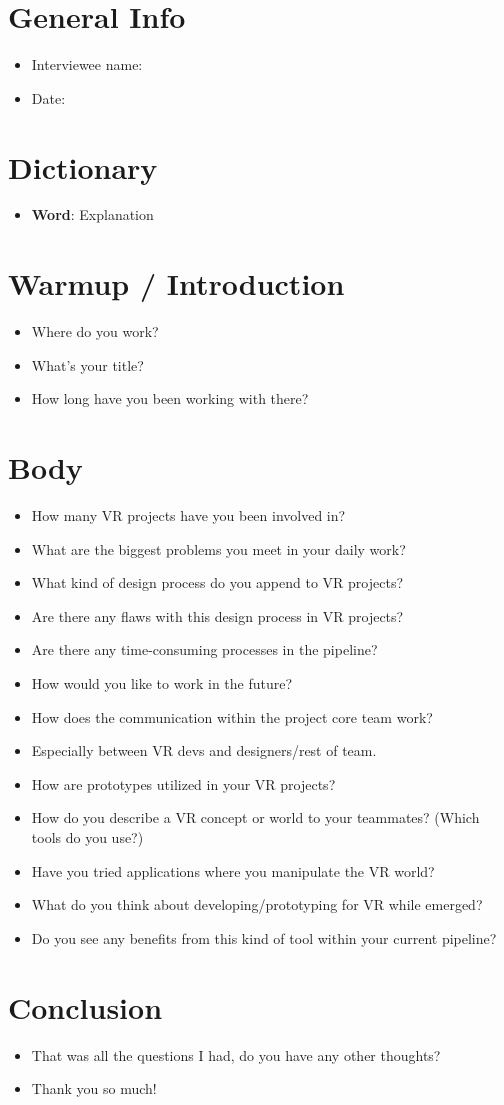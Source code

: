 \section{General Info}
{\renewcommand\labelitemi{}
\begin{itemize}
  \item Interviewee name:
  \item Date:
\end{itemize}
\section{Dictionary}
\begin{itemize}
  \item \textbf{Word}: Explanation
\end{itemize}

\section{Warmup / Introduction}
\begin{itemize}
\item
Where do you work?
\item
What's your title?
\item
How long have you been working with there?

\end{itemize}
\section{Body}
\begin{itemize}
\item
How many VR projects have you been involved in?
\item
What are the biggest problems you meet in your daily work?
\item
What kind of design process do you append to VR projects?
\item
Are there any flaws with this design process in VR projects?
\item
Are there any time-consuming processes in the pipeline?
\item
How would you like to work in the future?
\item
How does the communication within the project core team work?
\item
Especially between VR devs and designers/rest of team.
\item
How are prototypes utilized in your VR projects?
\item
How do you describe a VR concept or world to your teammates? (Which tools do you use?)
\item
Have you tried applications where you manipulate the VR world?
\item
What do you think about developing/prototyping for VR while emerged?
\item
Do you see any benefits from this kind of tool within your current pipeline?
\end{itemize}
\section{Conclusion}
\begin{itemize}
  \item
That was all the questions I had, do you have any other thoughts?
\item
Thank you so much!
\end{itemize}
}
